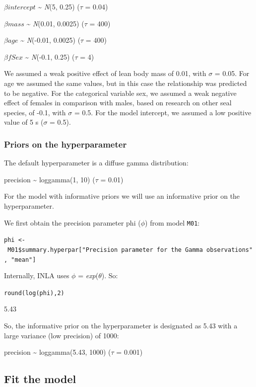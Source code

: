 \documentclass[
]{book}
\begin{document}
\(\beta intercept\) \textasciitilde{} \emph{N}(5, 0.25) (\(\tau\) = 0.04)

\(\beta mass\) \textasciitilde{} \emph{N}(0.01, 0.0025) (\(\tau\) = 400)

\(\beta age\) \textasciitilde{} \emph{N}(-0.01, 0.0025) (\(\tau\) = 400)

\(\beta fSex\) \textasciitilde{} \emph{N}(-0.1, 0.25) (\(\tau\) = 4)

We assumed a weak positive effect of lean body mass of 0.01, with \(\sigma\) = 0.05. For age we assumed the same values, but in this case the relationship was predicted to be negative. For the categorical variable sex, we assumed a weak negative effect of females in comparison with males, based on research on other seal species, of -0.1, with \(\sigma\) = 0.5. For the model intercept, we assumed a low positive value of 5 s (\(\sigma\) = 0.5).

\hypertarget{gamma-hyper}{%
\subsubsection{Priors on the hyperparameter}\label{gamma-hyper}}

The default hyperparameter is a diffuse gamma distribution:

precision \textasciitilde{} loggamma(1, 10) (\(\tau\) = 0.01)

For the model with informative priors we will use an informative prior on the hyperparameter.

We first obtain the precision parameter phi (\(\phi\)) from model \texttt{M01}:

\texttt{phi\ \textless{}-\ M01\$summary.hyperpar{[}"Precision\ parameter\ for\ the\ Gamma\ observations",\ "mean"{]}}

Internally, INLA uses \(\phi\) = \emph{exp}(\(\theta\)). So:

\texttt{round(log(phi),2)}

5.43

So, the informative prior on the hyperparameter is designated as 5.43 with a large variance (low precision) of 1000:

precision \textasciitilde{} loggamma(5.43, 1000) (\(\tau\) = 0.001)

\hypertarget{gamma-fit-model}{%
\subsection{Fit the model}\label{gamma-fit-model}}
\end{document}
